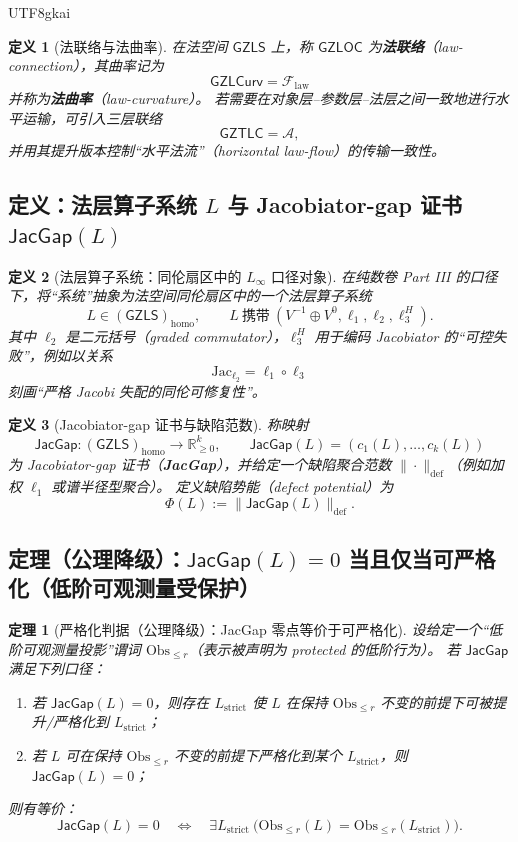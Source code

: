 \documentclass[12pt]{article}
\newtheorem{definition}{定义}[section]
\newtheorem{theorem}{定理}[section]
\newcommand{\GZLS}{\ensuremath{\mathsf{GZLS}}}
\newcommand{\GZLOC}{\ensuremath{\mathsf{GZLOC}}}
\newcommand{\GZLCurv}{\ensuremath{\mathsf{GZLCurv}}}
\newcommand{\GZTLC}{\ensuremath{\mathsf{GZTLC}}}
\newcommand{\JacGap}{\ensuremath{\mathsf{JacGap}}}
\begin{document}
\begin{CJK*}{UTF8}{gkai}
\begin{definition}[法联络与法曲率]
\label{def:law-connection-curvature}
在法空间 $\GZLS$ 上，称 $\GZLOC$ 为\textbf{法联络}（law-connection），其曲率记为
\[
\GZLCurv=\mathcal{F}_{\mathrm{law}}
\]
并称为\textbf{法曲率}（law-curvature）。
若需要在对象层–参数层–法层之间一致地进行水平运输，可引入三层联络
\[
\GZTLC=\mathcal{A},
\]
并用其提升版本控制“水平法流”（horizontal law-flow）的传输一致性。
\end{definition}

\subsection{定义：法层算子系统 $L$ 与 Jacobiator-gap 证书 $\JacGap(L)$}

\begin{definition}[法层算子系统：同伦扇区中的 $L_\infty$ 口径对象]
\label{def:law-level-operator-system}
在纯数卷 Part III 的口径下，将“系统”抽象为法空间同伦扇区中的一个法层算子系统
\[
L\in (\GZLS)_{\mathrm{homo}},
\qquad
L\ \text{携带}\ (V^{-1}\oplus V^{0},\ell_1,\ell_2,\ell_3^H).
\]
其中 $\ell_2$ 是二元括号（graded commutator），$\ell_3^H$ 用于编码 Jacobiator 的“可控失败”，例如以关系
\[
\mathrm{Jac}_{\ell_2}=\ell_1\circ \ell_3
\]
刻画“严格 Jacobi 失配的同伦可修复性”。
\end{definition}

\begin{definition}[Jacobiator-gap 证书与缺陷范数]
\label{def:jacgap-certificate}
称映射
\[
\JacGap:(\GZLS)_{\mathrm{homo}}\to \mathbb{R}_{\ge 0}^k,
\qquad
\JacGap(L)=(c_1(L),\dots,c_k(L))
\]
为 Jacobiator-gap 证书（\textbf{JacGap}），并给定一个缺陷聚合范数 $\|\cdot\|_{\mathrm{def}}$（例如加权 $\ell_1$ 或谱半径型聚合）。
定义缺陷势能（defect potential）为
\[
\Phi(L):=\|\JacGap(L)\|_{\mathrm{def}}.
\]
\end{definition}

\subsection{定理（公理降级）：$\JacGap(L)=0$ 当且仅当可严格化（低阶可观测量受保护）}

\begin{theorem}[严格化判据（公理降级）：JacGap 零点等价于可严格化]
\label{thm:jacgap-zero-iff-strictifiable}
设给定一个“低阶可观测量投影”谓词 $\mathrm{Obs}_{\le r}$（表示被声明为 protected 的低阶行为）。
若 $\JacGap$ 满足下列口径：
\begin{enumerate}
  \item 若 $\JacGap(L)=0$，则存在 $L_{\mathrm{strict}}$ 使 $L$ 在保持 $\mathrm{Obs}_{\le r}$ 不变的前提下可被提升/严格化到 $L_{\mathrm{strict}}
    $；
  \item 若 $L$ 可在保持 $\mathrm{Obs}_{\le r}$ 不变的前提下严格化到某个 $L_{\mathrm{strict}}$，则 $\JacGap(L)=0$；
\end{enumerate}
则有等价：
\[
\JacGap(L)=0
\quad\Longleftrightarrow\quad
\exists L_{\mathrm{strict}}\ \bigl(\mathrm{Obs}_{\le r}(L)=\mathrm{Obs}_{\le r}(L_{\mathrm{strict}})\bigr).
\]
\end{theorem}


\end{CJK*}
\end{document}
